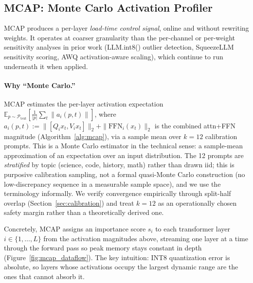 \documentclass{article}
\begin{document}
\subsection{MCAP: Monte Carlo Activation Profiler}
\label{sec:mcap}

MCAP produces a per-layer \emph{load-time control signal}, online and
without rewriting weights. It operates at coarser granularity than the
per-channel or per-weight sensitivity analyses in prior work (LLM.int8()
outlier detection, SqueezeLLM sensitivity scoring, AWQ activation-aware
scaling), which continue to run underneath it when applied.

\paragraph{Why ``Monte Carlo.''}
\begin{sloppypar}
MCAP estimates the per-layer activation expectation
$\mathbb{E}_{p \sim \mathcal{P}_{\text{text}}}\!\left[\frac{1}{|p|}\sum_t \|a_i(p, t)\|\right]$,
where $a_i(p,t) := \|[Q_i x_t, V_i x_t]\|_2 + \|\text{FFN}_i(x_t)\|_2$ is the combined
attn+FFN magnitude (Algorithm~\ref{alg:mcap}), via a sample mean over $k{=}12$
calibration prompts. This is a Monte Carlo estimator in the technical sense: a
sample-mean approximation of an expectation over an input distribution. The 12 prompts
are \emph{stratified} by topic (science, code, history, math) rather than drawn iid;
this is purposive calibration sampling, not a formal quasi-Monte Carlo construction
(no low-discrepancy sequence in a measurable sample space), and we use the terminology
informally. We verify convergence empirically through split-half overlap
(Section~\ref{sec:calibration}) and treat $k{=}12$ as an operationally chosen safety
margin rather than a theoretically derived one.
\end{sloppypar}

Concretely, MCAP assigns an importance score $s_i$ to each transformer layer
$i \in \{1, \ldots, L\}$ from the activation magnitudes above, streaming one layer at a
time through the forward pass so peak memory stays constant in depth
(Figure~\ref{fig:mcap_dataflow}). The key
intuition: INT8 quantization error is absolute, so layers whose activations occupy the
largest dynamic range are the ones that cannot absorb it.
\end{document}
